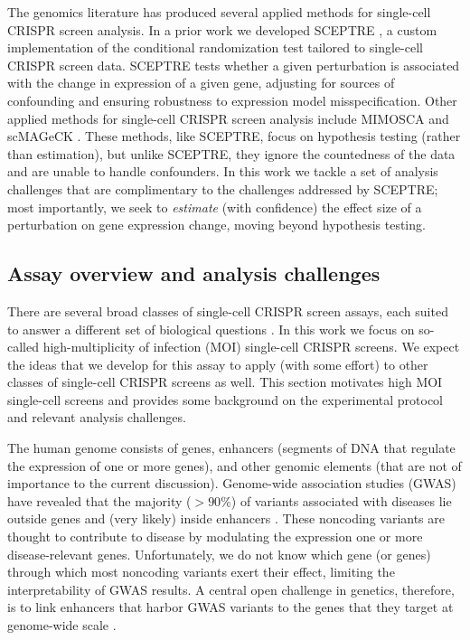 \documentclass[12pt]{article}
\begin{document}
The genomics literature has produced several applied methods for single-cell CRISPR screen analysis. In a prior work we developed SCEPTRE \cite{Barry2020}, a custom implementation of the conditional randomization test \cite{Candes2018, Liu2021} tailored to single-cell CRISPR screen data. SCEPTRE tests whether a given perturbation is associated with the change in expression of a given gene, adjusting for sources of confounding and ensuring robustness to expression model misspecification. Other applied methods for single-cell CRISPR screen analysis include MIMOSCA \cite{Dixit2016} and scMAGeCK \cite{Yang2019}. These methods, like SCEPTRE, focus on hypothesis testing (rather than estimation), but unlike SCEPTRE, they ignore the countedness of the data and are unable to handle confounders. In this work we tackle a set of analysis challenges that are complimentary to the challenges addressed by SCEPTRE; most importantly, we seek to \textit{estimate} (with confidence) the effect size of a perturbation on gene expression change, moving beyond hypothesis testing.

\subsection{Assay overview and analysis challenges}

There are several broad classes of single-cell CRISPR screen assays, each suited to answer a different set of biological questions \cite{Gasperini2019,Datlinger2021,Mimitou2019}. In this work we focus on so-called high-multiplicity of infection (MOI) single-cell CRISPR screens. We expect the ideas that we develop for this assay to apply (with some effort) to other classes of single-cell CRISPR screens as well. This section motivates high MOI single-cell screens and provides some background on the experimental protocol and relevant analysis challenges.

The human genome consists of genes, enhancers (segments of DNA that regulate the expression of one or more genes), and other genomic elements (that are not of importance to the current discussion). Genome-wide association studies (GWAS) have revealed that the majority ($>90\%$) of variants associated with diseases lie outside genes and (very likely) inside enhancers \cite{Gallagher2018}. These noncoding variants are thought to contribute to disease by modulating the expression one or more disease-relevant genes. Unfortunately, we do not know which gene (or genes) through which most noncoding variants exert their effect, limiting the interpretability of GWAS results. A central open challenge in genetics, therefore, is to link enhancers that harbor GWAS variants to the genes that they target at genome-wide scale \cite{Gasperini2020}.
\end{document}
